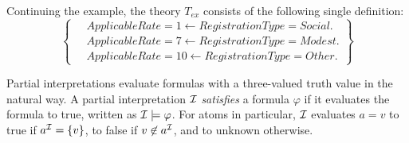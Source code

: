 
Continuing the example, the theory $T_{ex}$ consists of the following single definition:
\[\left\{
\begin{aligned}
& ~ ApplicableRate = 1 \leftarrow RegistrationType = Social. \\
& ~ ApplicableRate = 7 \leftarrow RegistrationType = Modest. \\
& ~ ApplicableRate = 10 \leftarrow RegistrationType = Other. 
\end{aligned}\right\}\]

Partial interpretations evaluate formulas %
with a three-valued truth value in the natural way.  A partial interpretation $\mathcal{I}$ \emph{satisfies} a formula $\varphi$ if it evaluates the formula to true, written as $\mathcal{I} \models \varphi$.
For atoms in particular, $\mathcal{I}$ evaluates $a=v$ to true if $a^{\mathcal{I}}=\{v\}$, to false if $v \not \in a^{\mathcal{I}}$, and to unknown otherwise. 


